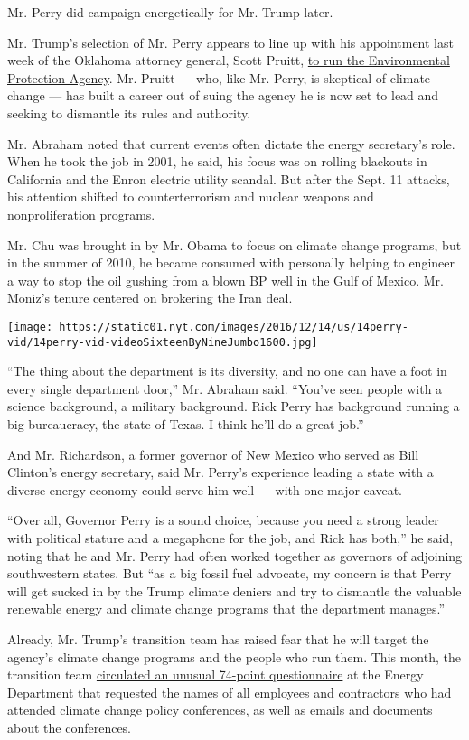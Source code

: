Mr. Perry did campaign energetically for Mr. Trump later.

Mr. Trump's selection of Mr. Perry appears to line up with his
appointment last week of the Oklahoma attorney general, Scott Pruitt,
\href{https://www.nytimes.com/2016/12/07/us/politics/scott-pruitt-epa-trump.html}{to
run the Environmental Protection Agency}. Mr. Pruitt --- who, like Mr.
Perry, is skeptical of climate change --- has built a career out of
suing the agency he is now set to lead and seeking to dismantle its
rules and authority.

Mr. Abraham noted that current events often dictate the energy
secretary's role. When he took the job in 2001, he said, his focus was
on rolling blackouts in California and the Enron electric utility
scandal. But after the Sept. 11 attacks, his attention shifted to
counterterrorism and nuclear weapons and nonproliferation programs.

Mr. Chu was brought in by Mr. Obama to focus on climate change programs,
but in the summer of 2010, he became consumed with personally helping to
engineer a way to stop the oil gushing from a blown BP well in the Gulf
of Mexico. Mr. Moniz's tenure centered on brokering the Iran deal.

\texttt{[image: https://static01.nyt.com/images/2016/12/14/us/14perry-vid/14perry-vid-videoSixteenByNineJumbo1600.jpg]}

``The thing about the department is its diversity, and no one can have a
foot in every single department door,'' Mr. Abraham said. ``You've seen
people with a science background, a military background. Rick Perry has
background running a big bureaucracy, the state of Texas. I think he'll
do a great job.''

And Mr. Richardson, a former governor of New Mexico who served as Bill
Clinton's energy secretary, said Mr. Perry's experience leading a state
with a diverse energy economy could serve him well --- with one major
caveat.

``Over all, Governor Perry is a sound choice, because you need a strong
leader with political stature and a megaphone for the job, and Rick has
both,'' he said, noting that he and Mr. Perry had often worked together
as governors of adjoining southwestern states. But ``as a big fossil
fuel advocate, my concern is that Perry will get sucked in by the Trump
climate deniers and try to dismantle the valuable renewable energy and
climate change programs that the department manages.''

Already, Mr. Trump's transition team has raised fear that he will target
the agency's climate change programs and the people who run them. This
month, the transition team
\href{http://www.nytimes.com/2016/12/09/us/politics/climate-change-energy-department-donald-trump-transition.html}{circulated
an unusual 74-point questionnaire} at the Energy Department that
requested the names of all employees and contractors who had attended
climate change policy conferences, as well as emails and documents about
the conferences.

